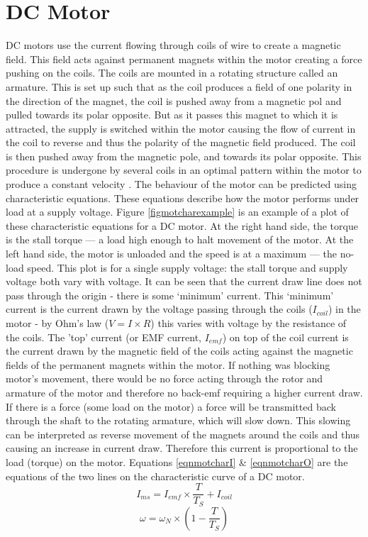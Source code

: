 \documentclass[twoside,a4]{report}
\def\br{\newline \newline \noindent}
\begin{document}
	\section*{DC Motor}
	DC motors use the current flowing through coils of wire to create a magnetic field. This field acts against permanent magnets within the motor creating a force pushing on the coils. The coils are mounted in a rotating structure called an armature. This is set up such that as the coil produces a field of one polarity in the direction of the magnet, the coil is pushed away from a magnetic pol and pulled towards its polar opposite. But as it passes this magnet to which it is attracted, the supply is switched within the motor causing the flow of current in the coil to reverse and thus the polarity of the magnetic field produced. The coil is then pushed away from the magnetic pole, and towards its polar opposite. This procedure is undergone by several coils in an optimal pattern within the motor to produce a constant velocity \cite{backdcmotor}.
	\br
	The behaviour of the motor can be predicted using characteristic equations. These equations describe how the motor performs under load at a supply voltage. Figure \ref{figmotcharexample} is an example of a plot of these characteristic equations for a DC motor. At the right hand side, the torque is the stall torque --- a load high enough to halt movement of the motor. At the left hand side, the motor is unloaded and the speed is at a maximum --- the no-load speed. This plot is for a single supply voltage: the stall torque and supply voltage both vary with voltage. 
	\br
	It can be seen that the current draw line does not pass through the origin - there is some `minimum' current. This `minimum' current is the current drawn by the voltage passing through the coils ($I_{coil}$) in the motor - by Ohm's law ($V = I \times R$) this varies with voltage by the resistance of the coils. The 'top' current (or EMF current, $I_{emf}$) on top of the coil current is the current drawn by the magnetic field of the coils acting against the magnetic fields of the permanent magnets within the motor. If nothing was blocking motor's movement, there would be no force acting through the rotor and armature of the motor and therefore no back-emf requiring a higher current draw. If there is a force (some load on the motor) a force will be transmitted back through the shaft to the rotating armature, which will slow down. This slowing can be interpreted as reverse movement of the magnets around the coils and thus causing an increase in current draw. Therefore this current is proportional to the load (torque) on the motor. Equations \ref{eqnmotcharI} \& \ref{eqnmotcharO} are the equations of the two lines on the characteristic curve of a DC motor.
	\begin{equation}
		I_{ms} = I_{emf} \times \frac{T}{T_S} + I_{coil}
		\label{eqnmotcharI}
	\end{equation}
	\begin{equation}
		\omega = \omega_N \times \left(1 - \frac{T}{T_S}\right)
		\label{eqnmotcharO}
	\end{equation}
	
\end{document}
